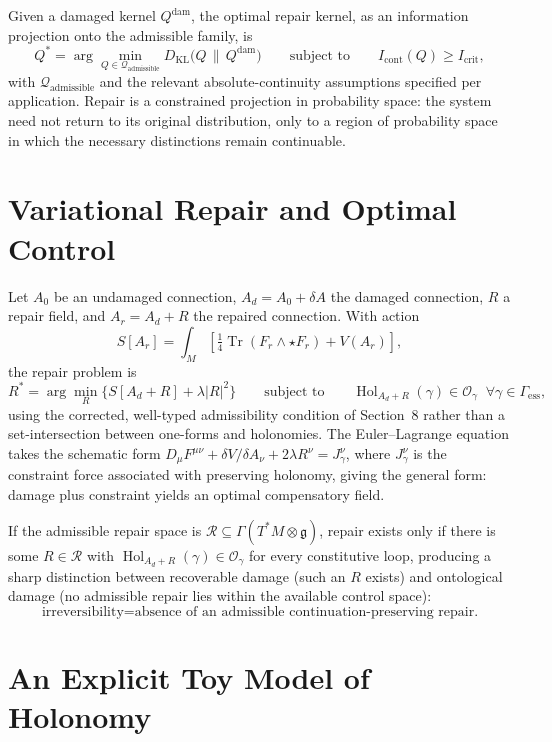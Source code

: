 \documentclass[11pt]{article}
\newcommand{\Hol}{\operatorname{Hol}}
\newcommand{\Tr}{\operatorname{Tr}}
\begin{document}
Given a damaged kernel $Q^{\mathrm{dam}}$, the optimal repair kernel, as an information projection onto the admissible family, is
\[
Q^\ast = \arg\min_{Q \in \mathcal{Q}_{\mathrm{admissible}}} D_{\mathrm{KL}}\bigl( Q \,\big\|\, Q^{\mathrm{dam}} \bigr) \qquad \text{subject to} \qquad I_{\mathrm{cont}}(Q) \geq I_{\mathrm{crit}},
\]
with $\mathcal{Q}_{\mathrm{admissible}}$ and the relevant absolute-continuity assumptions specified per application. Repair is a constrained projection in probability space: the system need not return to its original distribution, only to a region of probability space in which the necessary distinctions remain continuable.

\section{Variational Repair and Optimal Control}
\label{app:variational}

Let $A_0$ be an undamaged connection, $A_d = A_0 + \delta A$ the damaged connection, $R$ a repair field, and $A_r = A_d + R$ the repaired connection. With action
\[
S[A_r] = \int_M \left[ \tfrac{1}{4} \Tr(F_r \wedge \star F_r) + V(A_r) \right],
\]
the repair problem is
\[
R^\ast = \arg\min_R \bigl\{ S[A_d + R] + \lambda |R|^2 \bigr\} \qquad \text{subject to} \qquad \Hol_{A_d+R}(\gamma) \in \mathcal{O}_\gamma \;\; \forall \gamma \in \Gamma_{\mathrm{ess}},
\]
using the corrected, well-typed admissibility condition of Section~8 rather than a set-intersection between one-forms and holonomies. The Euler--Lagrange equation takes the schematic form $D_\mu F^{\mu\nu} + \delta V/\delta A_\nu + 2\lambda R^\nu = J^\nu_\gamma$, where $J^\nu_\gamma$ is the constraint force associated with preserving holonomy, giving the general form: damage plus constraint yields an optimal compensatory field.

If the admissible repair space is $\mathcal{R} \subseteq \Gamma(T^\ast M \otimes \mathfrak{g})$, repair exists only if there is some $R \in \mathcal{R}$ with $\Hol_{A_d+R}(\gamma) \in \mathcal{O}_\gamma$ for every constitutive loop, producing a sharp distinction between recoverable damage (such an $R$ exists) and ontological damage (no admissible repair lies within the available control space):
\[
\text{irreversibility} = \text{absence of an admissible continuation-preserving repair.}
\]

\section{An Explicit Toy Model of Holonomy}
\label{app:toy}
\end{document}
